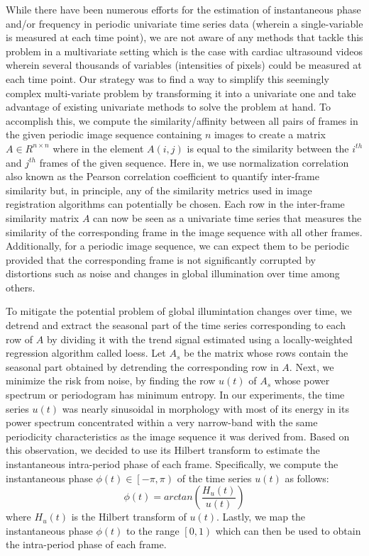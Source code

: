 \documentclass[runningheads,a4paper]{llncs}
\begin{document}
%
While there have been numerous efforts for the estimation of instantaneous phase and/or frequency in periodic univariate time series data (wherein a single-variable is measured at each time point)\cite{Boashash1992,Lu2013,Luo2003}, we are not aware of any methods that tackle this problem in a multivariate setting which is the case with cardiac ultrasound videos wherein several thousands of variables (intensities of pixels) could be measured at each time point. Our strategy was to find a way to simplify this seemingly complex multi-variate problem by transforming it into a univariate one and take advantage of existing univariate methods to solve the problem at hand. To accomplish this, we compute the similarity/affinity between all pairs of frames in the given periodic image sequence containing $n$ images to create a matrix $A \in R^{n \times n}$ where in the element $A(i,j)$ is equal to the similarity between the $i^{th}$ and $j^{th}$ frames of the given sequence. Here in, we use normalization correlation also known as the Pearson correlation coefficient to quantify inter-frame similarity but, in principle, any of the similarity metrics used in image registration algorithms \cite{Goshtasby2012} can potentially be chosen. Each row in the inter-frame similarity matrix $A$ can now be seen as a univariate time series that measures the similarity of the corresponding frame in the image sequence with all other frames. Additionally, for a periodic image sequence, we can expect them to be periodic provided that the corresponding frame is not significantly corrupted by distortions such as noise and changes in global illumination over time among others. 

To mitigate the potential problem of global illumintation changes over time, we detrend and extract the seasonal part of the time series corresponding to each row of $A$ by dividing it with the trend signal estimated using a locally-weighted regression algorithm called loess\cite{Cleveland1990}. Let $A_s$ be the matrix whose rows contain the seasonal part obtained by detrending the corresponding row in $A$. Next, we minimize the risk from noise, by finding the row $u(t)$ of $A_s$ whose power spectrum or periodogram has minimum entropy. In our experiments, the time series $u(t)$ was nearly sinusoidal in morphology with most of its energy in its power spectrum concentrated within a very narrow-band with the same periodicity characteristics as the image sequence it was derived from. Based on this observation, we decided to use its Hilbert transform \cite{Lu2013} to estimate the instantaneous intra-period phase  of each frame. Specifically, we compute the instantaneous phase $\phi(t) \in \left [  -\pi, \pi\right )$ of the time series $u(t)$ as follows:
\begin{equation}
\phi(t) = arctan \left( \frac{H_u(t)}{u(t)}\right)
\end{equation} 
where $H_u(t)$ is the Hilbert transform of $u(t)$. Lastly, we map the instantaneous phase $\phi(t)$ to the range $\left [  0, 1\right )$ which can then be used to obtain the intra-period phase of each frame.
\end{document}
